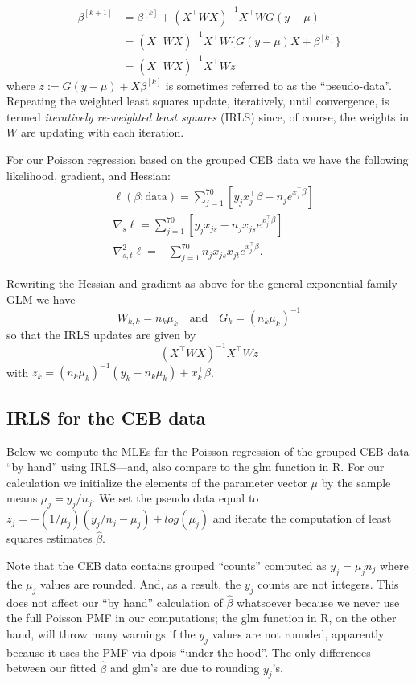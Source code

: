 \documentclass[
]{book}
\begin{document}
\begin{align*}
\beta^{[k+1]} &= \beta^{[k]} + (X^\top WX)^{-1}X^\top WG(y-\mu)\\
& = (X^\top WX)^{-1}X^\top W\{G(y-\mu)X+\beta^{[k]}\}\\
& = (X^\top WX)^{-1}X^\top Wz
\end{align*}
where \(z := G(y-\mu)+X\beta^{[k]}\) is sometimes referred to as the ``pseudo-data''. Repeating the weighted least squares update, iteratively, until convergence, is termed \emph{iteratively re-weighted least squares} (IRLS) since, of course, the weights in \(W\) are updating with each iteration.

For our Poisson regression based on the grouped CEB data we have the following likelihood, gradient, and Hessian:
\begin{align*}
&\ell(\beta;\text{data}) = \sum_{j=1}^{70} \left[y_j x_j^\top \beta - n_j e^{x_j^\top \beta}\right]\\
&\nabla_s \ell = \sum_{j=1}^{70} \left[y_j x_{js} - n_j x_{js}e^{x_j^\top \beta}\right]\\
&\nabla^2_{s,t} \ell = -\sum_{j=1}^{70}  n_j x_{js}x_{jt}e^{x_j^\top \beta}.
\end{align*}

Rewriting the Hessian and gradient as above for the general exponential family GLM we have
\[W_{k,k} = n_k\mu_k\quad\text{and}\quad G_k = (n_k\mu_k)^{-1}\]
so that the IRLS updates are given by
\[(X^\top WX)^{-1}X^\top Wz\]
with \(z_k = (n_k\mu_k)^{-1}(y_k - n_k\mu_k) + x_k^\top \beta\).

\hypertarget{irls-for-the-ceb-data}{%
\subsection{IRLS for the CEB data}\label{irls-for-the-ceb-data}}

Below we compute the MLEs for the Poisson regression of the grouped CEB data ``by hand'' using IRLS---and, also compare to the glm function in R. For our calculation we initialize the elements of the parameter vector \(\mu\) by the sample means \(\mu_j = y_j/n_j\). We set the pseudo data equal to \(z_j = -(1/\mu_j)(y_j / n_j - \mu_j) + log(\mu_j)\) and iterate the computation of least squares estimates \(\hat\beta\).

Note that the CEB data contains grouped ``counts'' computed as \(y_j = \mu_jn_j\) where the \(\mu_j\) values are rounded. And, as a result, the \(y_j\) counts are not integers. This does not affect our ``by hand'' calculation of \(\hat\beta\) whatsoever because we never use the full Poisson PMF in our computations; the glm function in R, on the other hand, will throw many warnings if the \(y_j\) values are not rounded, apparently because it uses the PMF via dpois ``under the hood''. The only differences between our fitted \(\hat\beta\) and glm's are due to rounding \(y_j\)'s.
\end{document}
